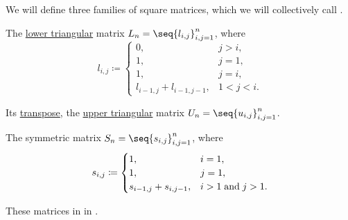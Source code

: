\begin{definition}\label{def:pascal_matrix}
  We will define three families of square matrices, which we will collectively call .
  \begin{thmenum}
     The \hyperref[def:triangular_matrix]{lower triangular} matrix \( L_n = \seq{ l_{i,j} }_{i,j=1}^n \), where
    \begin{equation*}
      l_{i,j} \coloneqq \begin{cases}
        0,                       &j > i, \\
        1,                       &j = 1, \\
        1,                       &j = i, \\
        l_{i-1,j} + l_{i-1,j-1}, &1 < j < i.
      \end{cases}
    \end{equation*}

     Its \hyperref[def:transpose_matrix]{transpose}, the \hyperref[def:triangular_matrix]{upper triangular} matrix \( U_n = \seq{ u_{i,j} }_{i,j=1}^n \).

     The symmetric matrix \( S_n = \seq{ s_{i,j} }_{i,j=1}^n \), where
    \begin{equation*}
      s_{i,j} \coloneqq \begin{cases}
        1,                     &i = 1, \\
        1,                     &j = 1, \\
        s_{i-1,j} + s_{i,j-1}, &i > 1 \T{and} j > 1.
      \end{cases}
    \end{equation*}
  \end{thmenum}
\end{definition}
\begin{comments}
  \item These matrices in  in \cite{notebook:code}.
\end{comments}

